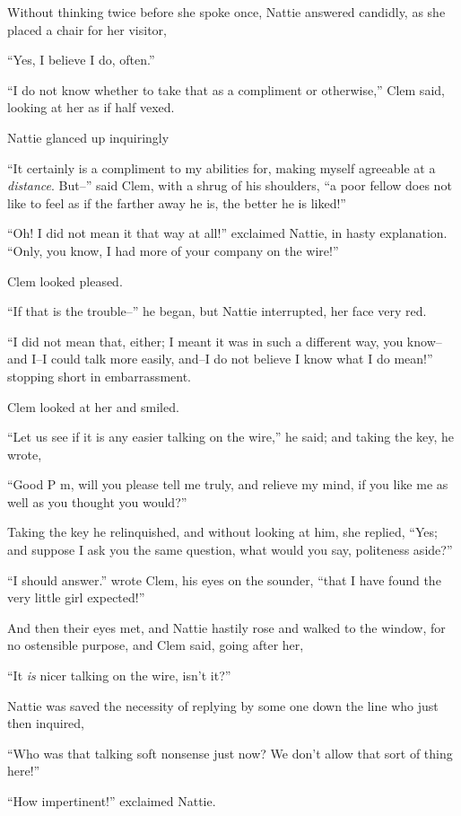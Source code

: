 Without thinking twice before she spoke once, Nattie answered candidly,
as she placed a chair for her visitor,

``Yes, I believe I do, often.''

``I do not know whether to take that as a compliment or otherwise,'' Clem
said, looking at her as if half vexed.

Nattie glanced up inquiringly

``It certainly is a compliment to my abilities for, making myself
agreeable at a \emph{distance}. But--'' said Clem, with a shrug of his
shoulders, ``a poor fellow does not like to feel as if the farther away
he is, the better he is liked!''

``Oh! I did not mean it that way at all!'' exclaimed Nattie, in hasty
explanation. ``Only, you know, I had more of your company on the wire!''

Clem looked pleased.

``If that is the trouble--'' he began, but Nattie interrupted, her face
very red.

``I did not mean that, either; I meant it was in such a different way,
you know--and I--I could talk more easily, and--I do not believe I know
what I do mean!'' stopping short in embarrassment.

Clem looked at her and smiled.

``Let us see if it is any easier talking on the wire,'' he said; and
taking the key, he wrote,

``Good P m, will you please tell me truly, and relieve my mind, if you
like me as well as you thought you would?''

Taking the key he relinquished, and without looking at him, she replied,
``Yes; and suppose I ask you the same question, what would you say,
politeness aside?''

``I should answer.'' wrote Clem, his eyes on the sounder, ``that I have
found the very little girl expected!''

And then their eyes met, and Nattie hastily rose and walked to the
window, for no ostensible purpose, and Clem said, going after her,

``It \emph{is} nicer talking on the wire, isn't it?''

Nattie was saved the necessity of replying by some one down the line who
just then inquired,

``Who was that talking soft nonsense just now? We don't allow that sort
of thing here!''

``How impertinent!'' exclaimed Nattie.

